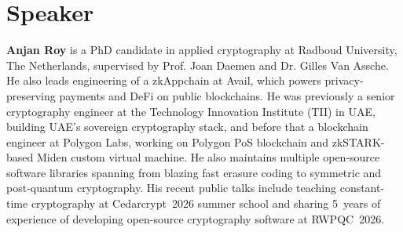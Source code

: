 \documentclass[10pt,a4paper]{article}
\begin{document}
\section*{Speaker}

\textbf{Anjan Roy} is a PhD candidate in applied cryptography at Radboud University, The Netherlands, supervised by Prof. Joan Daemen and Dr. Gilles Van Assche.
He also leads engineering of a zkAppchain at Avail, which powers privacy-preserving payments and DeFi on public blockchains.
He was previously a senior cryptography engineer at the Technology Innovation Institute (TII) in UAE, building UAE's sovereign cryptography stack, and before that a blockchain engineer at Polygon Labs, working on Polygon PoS blockchain and zkSTARK-based Miden custom virtual machine.
He also maintains multiple open-source software libraries spanning from blazing fast erasure coding to symmetric and post-quantum cryptography.
His recent public talks include teaching constant-time cryptography at Cedarcrypt~2026 summer school and sharing 5~years of experience of developing open-source cryptography software at RWPQC~2026.

{\footnotesize


}
\end{document}
